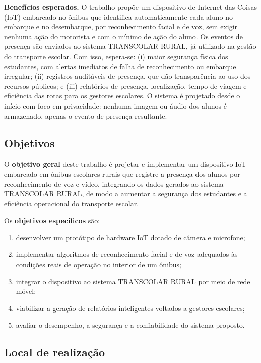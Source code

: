 \documentclass[
    12pt,
    oneside,
    a4paper,
    article,
    english,
    brazil
    ]{abntex2}
\begin{document}
\textbf{Benefícios esperados.} O trabalho propõe um dispositivo de Internet das
Coisas (IoT) embarcado no ônibus que identifica automaticamente cada aluno no
embarque e no desembarque, por reconhecimento facial e de voz, sem exigir
nenhuma ação do motorista e com o mínimo de ação do aluno. Os eventos de presença são enviados ao
sistema TRANSCOLAR RURAL, já utilizado na gestão do transporte escolar. Com
isso, espera-se: (i) maior segurança física dos estudantes, com alertas
imediatos de falha de reconhecimento ou embarque irregular; (ii) registros
auditáveis de presença, que dão transparência ao uso dos recursos públicos; e
(iii) relatórios de presença, localização, tempo de viagem e eficiência das
rotas para os gestores escolares. O sistema é projetado desde o início com
foco em privacidade: nenhuma imagem ou áudio dos alunos é armazenado, apenas
o evento de presença resultante.

\subsection{Objetivos}

O \textbf{objetivo geral} deste trabalho é projetar e implementar um dispositivo
IoT embarcado em ônibus escolares rurais que registre a presença dos alunos
por reconhecimento de voz e vídeo, integrando os dados gerados ao sistema
TRANSCOLAR RURAL, de modo a aumentar a segurança dos estudantes e a eficiência
operacional do transporte escolar.

Os \textbf{objetivos específicos} são:

\begin{enumerate}
    \item desenvolver um protótipo de hardware IoT dotado de câmera e microfone;
    \item implementar algoritmos de reconhecimento facial e de voz adequados às
          condições reais de operação no interior de um ônibus;
    \item integrar o dispositivo ao sistema TRANSCOLAR RURAL por meio de rede móvel;
    \item viabilizar a geração de relatórios inteligentes voltados a gestores escolares;
    \item avaliar o desempenho, a segurança e a confiabilidade do sistema proposto.
\end{enumerate}

\subsection{Local de realização}
\end{document}
